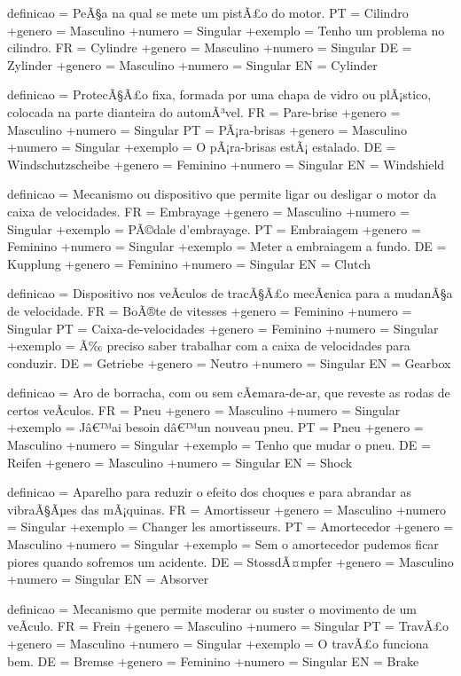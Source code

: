 \documentclass[a4paper]{article}
\begin{document}
definicao = PeÃ§a na qual se mete um pistÃ£o do motor.
PT = Cilindro
+genero = Masculino
+numero = Singular
+exemplo = Tenho um problema no cilindro.
FR = Cylindre
+genero = Masculino
+numero = Singular
DE = Zylinder
+genero = Masculino
+numero = Singular
EN = Cylinder

definicao = ProtecÃ§Ã£o fixa, formada por uma chapa de vidro ou plÃ¡stico, colocada na parte dianteira do automÃ³vel.
FR = Pare-brise
+genero = Masculino
+numero = Singular
PT = PÃ¡ra-brisas
+genero = Masculino
+numero = Singular
+exemplo = O pÃ¡ra-brisas estÃ¡ estalado.
DE = Windschutzscheibe
+genero = Feminino
+numero = Singular
EN = Windshield

definicao = Mecanismo ou dispositivo que permite ligar ou desligar o motor da caixa de velocidades.
FR = Embrayage
+genero = Masculino
+numero = Singular
+exemplo = PÃ©dale d'embrayage.
PT = Embraiagem
+genero = Feminino
+numero = Singular
+exemplo = Meter a embraiagem a fundo.
DE = Kupplung
+genero = Feminino
+numero = Singular
EN = Clutch

definicao = Dispositivo nos veÃ\-culos de tracÃ§Ã£o mecÃ¢nica para a mudanÃ§a de velocidade.
FR = BoÃ®te de vitesses
+genero = Feminino
+numero = Singular
PT = Caixa-de-velocidades
+genero = Feminino
+numero = Singular
+exemplo = Ã‰ preciso saber trabalhar com a caixa de velocidades para conduzir.
DE = Getriebe
+genero = Neutro
+numero = Singular
EN = Gearbox

definicao = Aro de borracha, com ou sem cÃ¢mara-de-ar, que reveste as rodas de certos veÃ\-culos.
FR = Pneu
+genero = Masculino
+numero = Singular
+exemplo = Jâ€™ai besoin dâ€™un nouveau pneu.
PT = Pneu
+genero = Masculino
+numero = Singular
+exemplo = Tenho que mudar o pneu.
DE = Reifen
+genero = Masculino
+numero = Singular
EN = Shock

definicao = Aparelho para reduzir o efeito dos choques e para abrandar as vibraÃ§Ãµes das mÃ¡quinas.
FR = Amortisseur
+genero = Masculino
+numero = Singular
+exemplo = Changer les amortisseurs.
PT = Amortecedor
+genero = Masculino
+numero = Singular
+exemplo = Sem o amortecedor pudemos ficar piores quando sofremos um acidente.
DE = StossdÃ¤mpfer
+genero = Masculino
+numero = Singular
EN = Absorver

definicao = Mecanismo que permite moderar ou suster o movimento de um veÃ\-culo.
FR = Frein
+genero = Masculino
+numero = Singular
PT = TravÃ£o
+genero = Masculino
+numero = Singular
+exemplo = O travÃ£o funciona bem.
DE = Bremse
+genero = Feminino
+numero = Singular
EN = Brake
\end{document}
